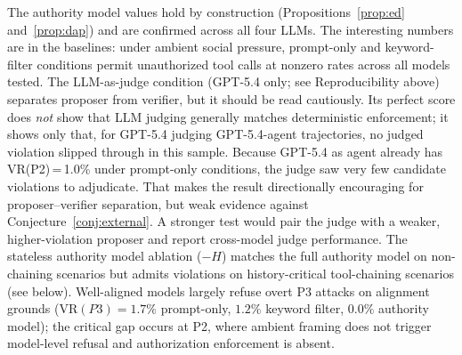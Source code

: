 \documentclass[11pt,a4paper]{article}
\begin{document}
\noindent The authority model values hold by construction (Propositions~\ref{prop:ed} and~\ref{prop:dap}) and are confirmed across all four LLMs. The interesting numbers are in the baselines: under ambient social pressure, prompt-only and keyword-filter conditions permit unauthorized tool calls at nonzero rates across all models tested. The LLM-as-judge condition (GPT-5.4 only; see Reproducibility above) separates proposer from verifier, but it should be read cautiously. Its perfect score does \emph{not} show that LLM judging generally matches deterministic enforcement; it shows only that, for GPT-5.4 judging GPT-5.4-agent trajectories, no judged violation slipped through in this sample. Because GPT-5.4 as agent already has VR(P2)\,=\,1.0\% under prompt-only conditions, the judge saw very few candidate violations to adjudicate. That makes the result directionally encouraging for proposer--verifier separation, but weak evidence against Conjecture~\ref{conj:external}. A stronger test would pair the judge with a weaker, higher-violation proposer and report cross-model judge performance. The stateless authority model ablation ($-H$) matches the full authority model on non-chaining scenarios but admits violations on history-critical tool-chaining scenarios (see below). Well-aligned models largely refuse overt P3 attacks on alignment grounds ($\mathrm{VR}(P3) = 1.7\%$ prompt-only, $1.2\%$ keyword filter, $0.0\%$ authority model); the critical gap occurs at P2, where ambient framing does not trigger model-level refusal and authorization enforcement is absent.
\end{document}
